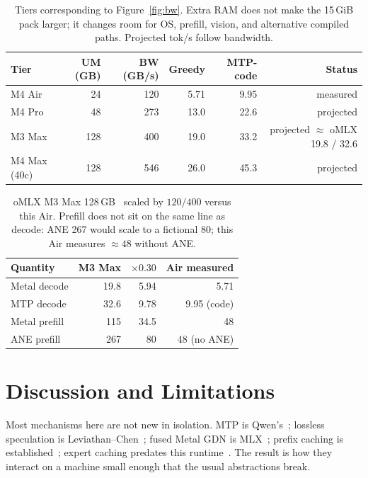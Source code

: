 \documentclass[11pt]{article}
\theoremstyle{definition}
\begin{document}
\begin{table}[t]
\centering
\caption{Tiers corresponding to Figure~\ref{fig:bw}. Extra RAM does not make the 15\,GiB pack larger; it changes room for OS, prefill, vision, and alternative compiled paths. Projected tok/s follow bandwidth.}
\label{tab:proj}
\small
\begin{tabular}{@{}lrrrrr@{}}
\toprule
Tier & UM (GB) & BW (GB/s) & Greedy & MTP-code & Status \\
\midrule
M4 Air & 24 & 120 & 5.71 & 9.95 & measured \\
M4 Pro & 48 & 273 & 13.0 & 22.6 & projected \\
M3 Max & 128 & 400 & 19.0 & 33.2 & projected ${\approx}$ oMLX 19.8 / 32.6 \\
M4 Max (40c) & 128 & 546 & 26.0 & 45.3 & projected \\
\bottomrule
\end{tabular}
\end{table}

\begin{table}[t]
\centering
\caption{oMLX M3 Max 128\,GB~\citep{omlx2874} scaled by $120/400$ versus this Air. Prefill does not sit on the same line as decode: ANE 267 would scale to a fictional 80; this Air measures ${\approx}48$ without ANE.}
\label{tab:scale}
\small
\begin{tabular}{@{}lrrr@{}}
\toprule
Quantity & M3 Max & ${\times}0.30$ & Air measured \\
\midrule
Metal decode & 19.8 & 5.94 & 5.71 \\
MTP decode & 32.6 & 9.78 & 9.95 (code) \\
Metal prefill & 115 & 34.5 & 48 \\
ANE prefill & 267 & 80 & 48 (no ANE) \\
\bottomrule
\end{tabular}
\end{table}

\FloatBarrier

\section{Discussion and Limitations}
\label{sec:discuss}

Most mechanisms here are not new in isolation. MTP is Qwen’s~\citep{qwen3}; lossless speculation is Leviathan--Chen~\citep{leviathan2023speculative,chen2023accelerating}; fused Metal GDN is MLX~\citep{mlx2023,mlxlm}; prefix caching is established~\citep{zheng2024sglang}; expert caching predates this runtime~\citep{rajbhandari2022deepspeed,he2022fastermoe}. The result is how they interact on a machine small enough that the usual abstractions break.
\end{document}
